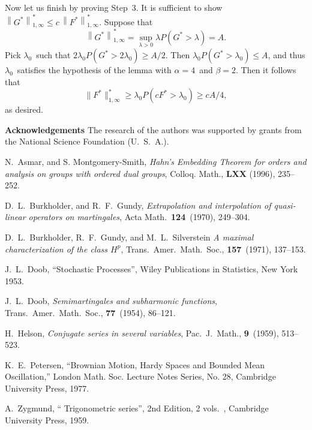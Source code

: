 \bigskip

Now let us finish by proving Step~3.  It is sufficient to show
$\left\| G^* \right\|^*_{1,\infty} \le c \, \left\|
            F^* \right\|^*_{1,\infty}$.  Suppose that 
$$ \left\| G^* \right\|^*_{1,\infty} = 
   \sup_{\lambda>0} \lambda P(G^*>\lambda)
   = A .$$
Pick $\lambda_0$\ such that 
$2\lambda_0 P(G^*>2\lambda_0) \ge A/2$.  
Then
$\lambda_0 P(G^*>\lambda_0) \le A$, 
and thus $\lambda_0$\ satisfies
the hypothesis of the lemma with 
$\alpha = 4$\ and $\beta = 2$.  Then
it follows that 
$$ \| F^*\|^*_{1,\infty} \ge 
\lambda_0 P(c F^* > \lambda_0) \ge c A/4 ,$$
as desired.





{\bf Acknowledgements}  The research of the authors was supported 
by grants from the National Science Foundation (U.\ S.\ A.). 

\begin{thebibliography}{Dillo 83}

 N.\ Asmar, and S. Montgomery-Smith,
{\em Hahn's Embedding Theorem for orders and 
analysis on groups with ordered dual groups}, 
Colloq. Math., {\bf LXX} (1996), 235--252.

  D.\ L.\ Burkholder, and R.\ F.\ Gundy,
{\em Extrapolation and interpolation of quasi-linear operators 
on martingales}, Acta Math.\ {\bf 124}\ (1970), 249--304.


  D.\ L.\ Burkholder, R.\ F.\ Gundy, 
and M.\ L.\ Silverstein
{\em A maximal characterization of the class $H^p$}, 
Trans.\ Amer.\ Math.\ Soc., {\bf 157}\ (1971), 137--153.

  J.\ L.\ Doob,
``Stochastic Processes'', Wiley Publications 
in Statistics, New York 1953. 

    J.\ L.\ Doob,
{\em Semimartingales and subharmonic functions}, 
Trans.\ Amer.\ Math.\ Soc., {\bf 77}\ (1954), 86--121.

  H.\ Helson,
{\em Conjugate series in several variables}, 
Pac.\ J.\ Math., {\bf 9}\ (1959), 513--523.

 K.\ E.\ Petersen, ``Brownian Motion,
Hardy Spaces and Bounded Mean Oscillation,'' 
London Math. Soc. Lecture Notes Series, No. 28, 
Cambridge University Press, 1977.

  A.\ Zygmund,
`` Trigonometric series'', 2nd Edition, 2 vols.\ , 
Cambridge University Press, 1959.

\end{thebibliography}








